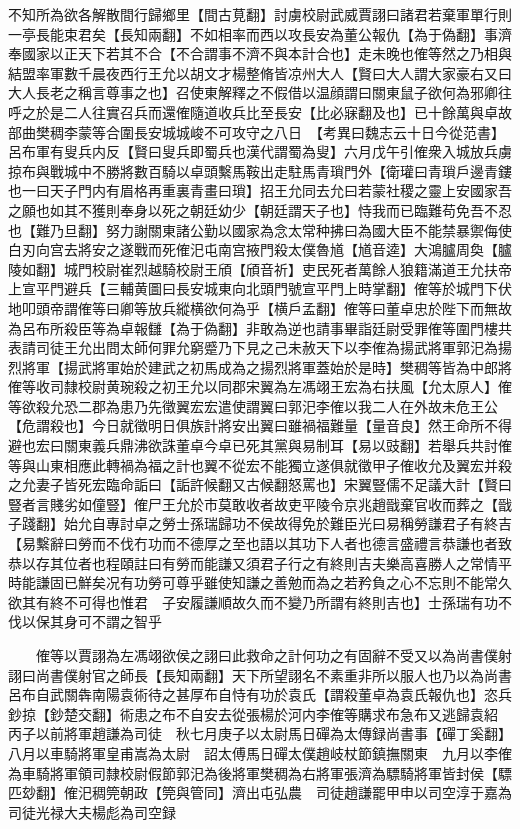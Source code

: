 不知所為欲各解散間行歸鄉里【間古莧翻】討虜校尉武威賈詡曰諸君若棄軍單行則一亭長能束君矣【長知兩翻】不如相率而西以攻長安為董公報仇【為于偽翻】事濟奉國家以正天下若其不合【不合謂事不濟不與本計合也】走未晚也傕等然之乃相與結盟率軍數千晨夜西行王允以胡文才楊整脩皆凉州大人【賢曰大人謂大家豪右又曰大人長老之稱言尊事之也】召使東解釋之不假借以温顔謂曰關東鼠子欲何為邪卿往呼之於是二人往實召兵而還傕隨道收兵比至長安【比必寐翻及也】已十餘萬與卓故部曲樊稠李蒙等合圍長安城城峻不可攻守之八日　【考異曰魏志云十日今從范書】呂布軍有叟兵内反【賢曰叟兵即蜀兵也漢代謂蜀為叟】六月戊午引傕衆入城放兵虜掠布與戰城中不勝將數百騎以卓頭繫馬鞍出走駐馬青瑣門外【衛瓘曰青瑣戶邊青鏤也一曰天子門内有眉格再重裏青畫曰瑣】招王允同去允曰若蒙社稷之靈上安國家吾之願也如其不獲則奉身以死之朝廷幼少【朝廷謂天子也】恃我而已臨難苟免吾不忍也【難乃旦翻】努力謝關東諸公勤以國家為念太常种拂曰為國大臣不能禁暴禦侮使白刃向宫去將安之遂戰而死傕汜屯南宫掖門殺太僕魯馗【馗音逵】大鴻臚周奐【臚陵如翻】城門校尉崔烈越騎校尉王頎【頎音祈】吏民死者萬餘人狼籍滿道王允扶帝上宣平門避兵【三輔黄圖曰長安城東向北頭門號宣平門上時掌翻】傕等於城門下伏地叩頭帝謂傕等曰卿等放兵縱横欲何為乎【横戶孟翻】傕等曰董卓忠於陛下而無故為呂布所殺臣等為卓報讎【為于偽翻】非敢為逆也請事畢詣廷尉受罪傕等圍門樓共表請司徒王允出問太師何罪允窮蹙乃下見之己未赦天下以李傕為揚武將軍郭汜為揚烈將軍【揚武將軍始於建武之初馬成為之揚烈將軍蓋始於是時】樊稠等皆為中郎將傕等收司隸校尉黄琬殺之初王允以同郡宋翼為左馮翊王宏為右扶風【允太原人】傕等欲殺允恐二郡為患乃先徵翼宏宏遣使謂翼曰郭汜李傕以我二人在外故未危王公【危謂殺也】今日就徵明日俱族計將安出翼曰雖禍福難量【量音良】然王命所不得避也宏曰關東義兵鼎沸欲誅董卓今卓已死其黨與易制耳【易以豉翻】若舉兵共討傕等與山東相應此轉禍為福之計也翼不從宏不能獨立遂俱就徵甲子傕收允及翼宏并殺之允妻子皆死宏臨命詬曰【詬許候翻又古候翻怒罵也】宋翼豎儒不足議大計【賢曰豎者言賤劣如僮豎】傕尸王允於市莫敢收者故吏平陵令京兆趙戩棄官收而葬之【戩子踐翻】始允自專討卓之勞士孫瑞歸功不侯故得免於難臣光曰易稱勞謙君子有終吉【易繫辭曰勞而不伐冇功而不德厚之至也語以其功下人者也德言盛禮言恭謙也者致恭以存其位者也程頤註曰有勞而能謙又須君子行之有終則吉夫樂高喜勝人之常情平時能謙固已鮮矣况有功勞可尊乎雖使知謙之善勉而為之若矜負之心不忘則不能常久欲其有終不可得也惟君　子安履謙順故久而不變乃所謂有終則吉也】士孫瑞有功不伐以保其身可不謂之智乎

　　傕等以賈詡為左馮翊欲侯之詡曰此救命之計何功之有固辭不受又以為尚書僕射詡曰尚書僕射官之師長【長知兩翻】天下所望詡名不素重非所以服人也乃以為尚書　呂布自武關犇南陽袁術待之甚厚布自恃有功於袁氏【謂殺董卓為袁氏報仇也】恣兵鈔掠【鈔楚交翻】術患之布不自安去從張楊於河内李傕等購求布急布又逃歸袁紹　丙子以前將軍趙謙為司徒　秋七月庚子以太尉馬日磾為太傳録尚書事【磾丁奚翻】　八月以車騎將軍皇甫嵩為太尉　詔太傅馬日磾太僕趙岐杖節鎮撫關東　九月以李傕為車騎將軍領司隸校尉假節郭汜為後將軍樊稠為右將軍張濟為驃騎將軍皆封侯【驃匹玅翻】傕汜稠筦朝政【筦與管同】濟出屯弘農　司徒趙謙罷甲申以司空淳于嘉為司徒光禄大夫楊彪為司空録

